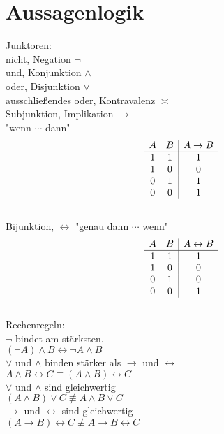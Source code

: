\section{Aussagenlogik}

Junktoren: \\
nicht, Negation $\neg$ \\
und, Konjunktion $\wedge$ \\
oder, Disjunktion $\vee$ \\
ausschließendes oder, Kontravalenz $\asymp$ \\
Subjunktion, Implikation $\rightarrow$ \\
"wenn $\cdots$ dann" \\
\[
\begin{array}{c c | c }
	A & B & A \rightarrow B \\ \hline
	1 & 1 & 1 \\
	1 & 0 & 0 \\
	0 & 1 & 1 \\
	0 & 0 & 1
\end{array}
\]\\
Bijunktion, $\leftrightarrow$
"genau dann $\cdots$ wenn"
\[
\begin{array}{c c | c }
	A & B & A \leftrightarrow B \\ \hline
	1 & 1 & 1 \\
	1 & 0 & 0 \\
	0 & 1 & 0 \\
	0 & 0 & 1
\end{array}
\]\\

Rechenregeln: \\
$\neg$ bindet am stärksten.\\
$ (\neg A) \wedge B \leftrightarrow \neg A \wedge B $ \\


$\vee$ und $\wedge$ binden stärker als $\rightarrow$ und $\leftrightarrow$ \\
$ A \wedge B \leftrightarrow C \equiv (A \wedge B) \leftrightarrow C $ \\

$\vee$ und $\wedge$ sind gleichwertig\\
$ (A \wedge B) \vee C \not\equiv A \wedge B \vee C $ \\

$\rightarrow$ und $\leftrightarrow$ sind gleichwertig\\
$ (A \rightarrow B) \leftrightarrow C \not\equiv A \rightarrow B \leftrightarrow C $ \\

